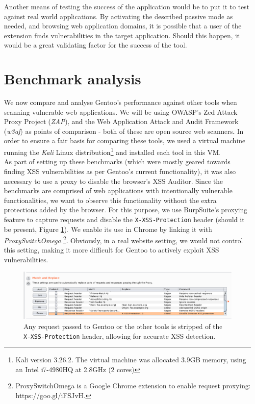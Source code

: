 Another means of testing the success of the application would be to put it to test against real world applications. By activating the described passive mode as needed, and browsing web application domains, it is possible that a user of the extension finds vulnerabilities in the target application. Should this happen, it would be a great validating factor for the success of the tool.


\section{Benchmark analysis}

We now compare and analyse Gentoo's performance against other tools when scanning vulnerable web applications. We will be using OWASP's Zed Attack Proxy Project (\textit{ZAP}), and the Web Application Attack and Audit Framework (\textit{w3af}) as points of comparison - both of these are open source web scanners. In order to ensure a fair basis for comparing these tools, we used a virtual machine running the \textit{Kali} Linux distribution\footnote{ Kali version 3.26.2. The virtual machine was allocated 3.9GB memory, using an Intel i7-4980HQ at 2.8GHz (2 cores)} and installed each tool in this VM. \\

 As part of setting up these benchmarks (which were mostly geared towards finding XSS vulnerabilities as per Gentoo's current functionality), it was also necessary to use a proxy to disable the browser's XSS Auditor. Since the benchmarks are comprised of web applications with intentionally vulnerable functionalities, we want to observe this functionality without the extra protections added by the browser. For this purpose, we use BurpSuite's proxying feature to capture requests and disable the \texttt{X-XSS-Protection} header (should it be present, Figure \ref{fig:burp_xss_disabled}). We enable its use in Chrome by linking it with \textit{ProxySwitchOmega} \footnote{ ProxySwitchOmega is a Google Chrome extension to enable request proxying: https://goo.gl/iFSJvH.}. Obviously, in a real website setting, we would not control this setting, making it more difficult for Gentoo to actively exploit XSS vulnerabilities. \\

\begin{figure}[h]
	\centering
	\includegraphics[width=\textwidth]{images/evaluation/burp_xss_disabled.png}
	\caption{Any request passed to Gentoo or the other tools is stripped of the \texttt{X-XSS-Protection} header, allowing for accurate XSS detection.}
	\label{fig:burp_xss_disabled}
\end{figure}


